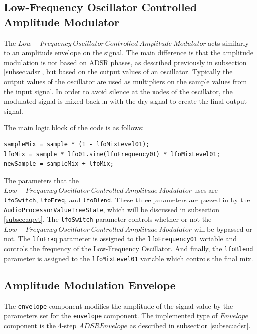 \documentclass[a4paper,12pt]{report}
\begin{document}
\subsection{Low-Frequency Oscillator Controlled Amplitude Modulator}
\label{subsec:lfcocontrolampmod}
The $Low-Frequency\ Oscillator\ Controlled\ Amplitude\ Modulator$ acts similarly to an amplitude envelope on the signal. The main difference is that the amplitude modulation is not based on ADSR phases, as described previously in subsection \ref{subsec:adsr}, but based on the output values of an oscillator. Typically the output values of the oscillator are used as multipliers on the sample values from the input signal. In order to avoid silence at the nodes of the oscillator, the modulated signal is mixed back in with the dry signal to create the final output signal.

The main logic block of the code is as follows:

 \noindent\begin{minipage}{\linewidth} \begin{lstlisting}[caption={LFO Mix},label={code:addsample},captionpos=b]
sampleMix = sample * (1 - lfoMixLevel01);
lfoMix = sample * lfo01.sine(lfoFrequency01) * lfoMixLevel01;
newSample = sampleMix + lfoMix;
\end{lstlisting} \end{minipage}

The parameters that the $Low-Frequency\ Oscillator\ Controlled\ Amplitude\ Modulator$ uses are \texttt{lfoSwitch}, \texttt{lfoFreq}, and \texttt{lfoBlend}. These three parameters are passed in by the \texttt{AudioProcessorValueTreeState}, which will be discussed in subsection \ref{subsec:apvt}. The \texttt{lfoSwitch} parameter controls whether or not the $Low-Frequency\ Oscillator\ Controlled\ Amplitude\ Modulator$ will be bypassed or not. The \texttt{lfoFreq} parameter is assigned to the \texttt{lfoFrequency01} variable and controls the frequency of the Low-Frequency Oscillator. And finally, the \texttt{lfoBlend} parameter is assigned to the \texttt{lfoMixLevel01} variable which controls the final mix.

\subsection{Amplitude Modulation Envelope}
\label{subsec:amenv}
The \texttt{envelope} component modifies the amplitude of the signal value by the parameters set for the \texttt{envelope} component. The implemented type of $Envelope$ component is the 4-step $ADSR Envelope$ as described in subsection \ref{subsec:adsr}. 
\end{document}
